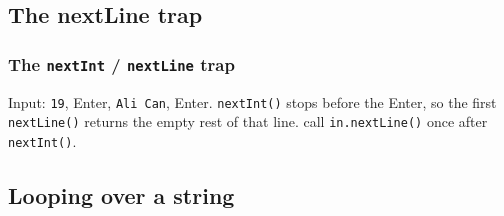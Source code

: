 \documentclass[aspectratio=169,10pt,compress]{beamer}
\begin{document}
\subsection[Trap]{The nextLine trap}




\begin{frame}[t,fragile] \frametitle{The \texttt{nextInt} / \texttt{nextLine} trap}

  \vspace{0.3em}
  \small Input: \texttt{19}, Enter, \texttt{Ali Can}, Enter. \texttt{nextInt()} stops before the Enter, so the first
  \texttt{nextLine()} returns the empty rest of that line.  call \texttt{in.nextLine()} once after \texttt{nextInt()}.
\end{frame}





\subsection[Loop]{Looping over a string}
\end{document}
